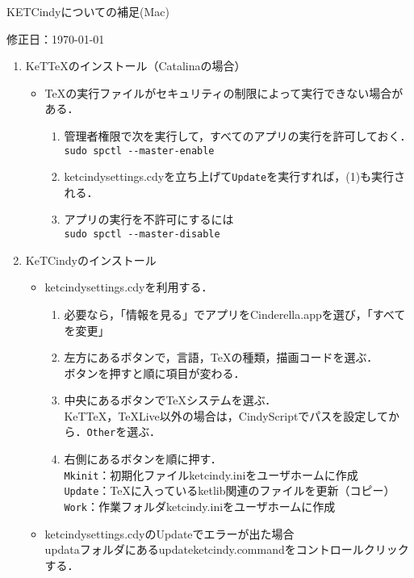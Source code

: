 \documentclass{ujarticle}
\begin{document}
\begin{center}
KETCindyについての補足(Mac)
\end{center}

\hfill 修正日：\today

\begin{enumerate}[\bf\large 1.]

\item KeTTeXのインストール（Catalinaの場合）
\begin{itemize}
\item \TeX の実行ファイルがセキュリティの制限によって実行できない場合がある．
\begin{enumerate}[(1)]
\item 管理者権限で次を実行して，すべてのアプリの実行を許可しておく．\\
\hspace*{10mm}\verb|sudo spctl --master-enable|
\item ketcindysettings.cdyを立ち上げて\verb|Update|を実行すれば，(1)も実行される．
\item アプリの実行を不許可にするには\\
\hspace*{10mm}\verb|sudo spctl --master-disable|

\end{enumerate}
\end{itemize}

\item KeTCindyのインストール
\begin{itemize}
\item ketcindysettings.cdyを利用する．
\begin{enumerate}[(1)]
\item 必要なら，「情報を見る」でアプリをCinderella.appを選び，「すべてを変更」
\item 左方にあるボタンで，言語，TeXの種類，描画コードを選ぶ．\\
\hspace*{10mm}ボタンを押すと順に項目が変わる．
\item 中央にあるボタンでTeXシステムを選ぶ．\\
\hspace*{10mm}KeTTeX，TeXLive以外の場合は，CindyScriptでパスを設定してから．\verb|Other|を選ぶ．
\item 右側にあるボタンを順に押す．\\
\hspace*{10mm}\verb|Mkinit|：初期化ファイルketcindy.iniをユーザホームに作成\\
\hspace*{10mm}\verb|Update|：TeXに入っているketlib関連のファイルを更新（コピー）\\
\hspace*{10mm}\verb|Work|：作業フォルダketcindy.iniをユーザホームに作成
\end{enumerate}
\item ketcindysettings.cdyのUpdateでエラーが出た場合\\
\hspace*{10mm}updataフォルダにあるupdateketcindy.commandをコントロールクリックする．
\end{itemize}


\end{enumerate}
\end{document}
